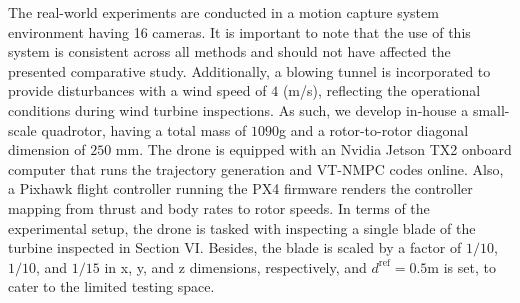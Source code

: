 



The real-world experiments are conducted in a motion capture system environment having 16 cameras. It is important to note that the use of this system is consistent across all methods and should not have affected the presented comparative study. Additionally, a blowing tunnel is incorporated to provide disturbances with a wind speed of $4$ (m/s), reflecting the operational conditions during wind turbine inspections.\textbf{}
As such, we develop in-house a small-scale quadrotor, having a total mass of $1090$g and a rotor-to-rotor diagonal dimension of $250$ mm. The drone is equipped with an Nvidia Jetson TX2 onboard computer that runs the trajectory generation and VT-NMPC codes online. Also, a Pixhawk flight controller running the PX4 firmware renders the controller mapping from thrust and body rates to rotor speeds. In terms of the experimental setup, the drone is tasked with inspecting a single blade of the turbine inspected in Section VI. Besides, the blade is scaled by a factor of $1/10$, $1/10$, and $1/15$ in x, y, and z dimensions, respectively, and $d^{\mathrm{ref}}=0.5$m is set, to cater to the limited testing space. %




